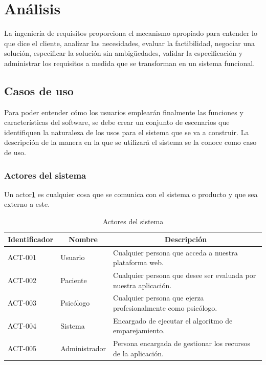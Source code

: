 \section{Análisis}

La ingeniería de requisitos proporciona el mecanismo apropiado para entender lo que dice el cliente, analizar las necesidades, evaluar la factibilidad, negociar una solución, especificar la solución sin ambigüedades, validar la especificación y administrar los requisitos a medida que se transforman en un sistema funcional\cite{pressman}.

\subsection{Casos de uso}
Para poder entender cómo los usuarios emplearán finalmente las funciones y características del software, se debe crear un conjunto de escenarios que identifiquen la naturaleza de los usos para el sistema que se va a construir. La descripción de la manera en la que se utilizará el sistema se la conoce como caso de uso.

\subsubsection{Actores del sistema}
Un actor\ref{tab_actores} es cualquier cosa que se comunica con el sistema o producto y que sea externo a este. 

\begin{table}[htpb]
\centering
\begin{tabularx}{\textwidth}{|l|X|X|}
\hline
\multicolumn{1}{|c|}{Identificador} & \multicolumn{1}{c|}{Nombre} & \multicolumn{1}{c|}{Descripción}                                 \\ \hline
ACT-001                             & Usuario                     & Cualquier persona que acceda a nuestra plataforma web.           \\ \hline
ACT-002                             & Paciente                    & Cualquier persona que desee ser evaluada por nuestra aplicación. \\ \hline
ACT-003                             & Psicólogo                   & Cualquier persona que ejerza profesionalmente como psicólogo.    \\ \hline
ACT-004                             & Sistema                     & Encargado de ejecutar el algoritmo de emparejamiento.            \\ \hline
ACT-005                             & Administrador               & Persona encargada de gestionar los recursos de la aplicación.    \\ \hline
\end{tabularx}
\caption{Actores del sistema}
\label{tab_actores}
\end{table}


